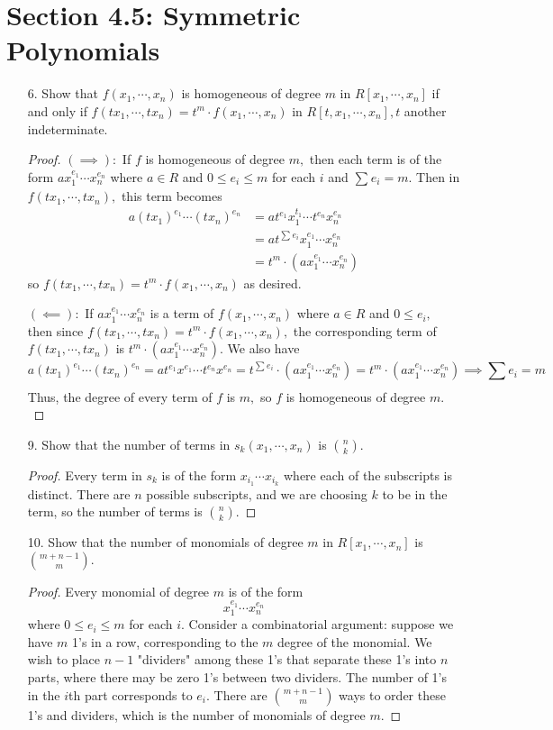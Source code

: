 \documentclass{article}
\begin{document}
\section*{Section 4.5: Symmetric Polynomials}

\begin{itemize}
	\item[6.] Show that $f(x_1, \cdots, x_n)$ is homogeneous of degree $m$ in $R[x_1, \cdots, x_n]$ if and only if $f(tx_1, \cdots, tx_n)=t^m \cdot f(x_1, \cdots, x_n)$ in $R[t, x_1, \cdots, x_n], t$ another indeterminate.
		\begin{proof}
			$(\implies):$ If $f$ is homogeneous of degree $m,$ then each term is of the form $ax_1^{e_1}\cdots x_n^{e_n}$ where $a\in R$ and $0\le e_i\le m$ for each $i$ and $\sum_{}^{} e_i=m.$ Then in $f(tx_1, \cdots, tx_n),$ this term becomes
			\begin{align*}
				a(tx_1)^{e_1}\cdots (tx_n)^{e_n} &= a t^{e_1} x_1^{t_1} \cdots t^{e_n} x_n^{e_n} \\
				&= a t^{\sum_{}^{}e_i} x_1^{e_1}\cdots x_n^{e_n} \\
				&= t^m \cdot (a x_1^{e_1} \cdots x_n^{e_n})
			\end{align*}
			so $f(tx_1, \cdots, tx_n) = t^m \cdot f(x_1, \cdots, x_n)$ as desired.

			$(\impliedby):$ If $ax_1^{e_1}\cdots x_n^{e_n}$ is a term of $f(x_1, \cdots, x_n)$ where $a\in R$ and $0\le e_i,$ then since $f(tx_1, \cdots, tx_n)=t^m\cdot f(x_1, \cdots, x_n),$ the corresponding term of $f(tx_1, \cdots, tx_n)$ is $t^m\cdot (ax_1^{e_1}\cdots x_n^{e_n}).$ We also have
			\[a(tx_1)^{e_1} \cdots (tx_n)^{e_n} = a t^{e_1} x^{e_1} \cdots  t^{e_n} x^{e_n} = t^{\sum_{}^{} e_i} \cdot (ax_1^{e_1}\cdots x_n^{e_n}) = t^m\cdot (ax_1^{e_1}\cdots x_n^{e_n})\implies \sum_{}^{} e_i = m\]
			Thus, the degree of every term of $f$ is $m,$ so $f$ is homogeneous of degree $m.$
		\end{proof}

	\item[9.] Show that the number of terms in $s_k(x_1, \cdots, x_n)$ is $\binom{n}{k}.$
		\begin{proof}
			Every term in $s_k$ is of the form $x_{i_1}\cdots x_{i_k}$ where each of the subscripts is distinct. There are $n$ possible subscripts, and we are choosing $k$ to be in the term, so the number of terms is $\binom{n}{k}.$
		\end{proof}

	\item[10.] Show that the number of monomials of degree $m$ in $R[x_1, \cdots, x_n]$ is $\binom{m+n-1}{m}.$
		\begin{proof}
			Every monomial of degree $m$ is of the form
			\[x_1^{e_1}\cdots x_n^{e_n}\]
			where $0\le e_i\le m$ for each $i.$ Consider a combinatorial argument: suppose we have $m$ 1's in a row, corresponding to the $m$ degree of the monomial. We wish to place $n-1$ "dividers" among these 1's that separate these 1's into $n$ parts, where there may be zero 1's between two dividers. The number of 1's in the $i$th part corresponds to $e_i.$ There are $\binom{m+n-1}{m}$ ways to order these 1's and dividers, which is the number of monomials of degree $m.$
		\end{proof}


\end{itemize}
\end{document}

